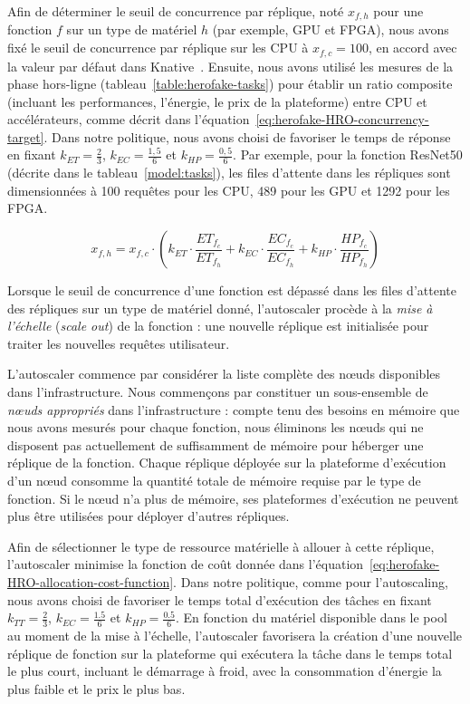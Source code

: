 Afin de déterminer le seuil de concurrence par réplique, noté $x_{f, h}$ pour une fonction $f$ sur un type de matériel $h$ (par exemple, GPU et FPGA), nous avons fixé le seuil de concurrence par réplique sur les CPU à $x_{f, c} = 100$, en accord avec la valeur par défaut dans Knative~\cite{knative-concurrency}. Ensuite, nous avons utilisé les mesures de la phase hors-ligne (tableau~\ref{table:herofake-tasks}) pour établir un ratio composite (incluant les performances, l'énergie, le prix de la plateforme) entre CPU et accélérateurs, comme décrit dans l'équation~\ref{eq:herofake-HRO-concurrency-target}. Dans notre politique, nous avons choisi de favoriser le temps de réponse en fixant $k_{ET} = \frac{2}{3}$, $k_{EC} = \frac{1,5}{6}$ et $k_{HP} = \frac{0,5}{6}$. Par exemple, pour la fonction ResNet50 (décrite dans le tableau~\ref{model:tasks}), les files d'attente dans les répliques sont dimensionnées à 100 requêtes pour les CPU, 489 pour les GPU et 1292 pour les FPGA.

\begin{equation}
    x_{f, h} = x_{f, c} \cdot (k_{ET} \cdot \frac{ET_{{f}_{c}}}{ET_{{f}_{h}}} + k_{EC} \cdot \frac{EC_{{f}_{c}}}{EC_{{f}_{h}}} + k_{HP} \cdot \frac{HP_{{f}_{c}}}{HP_{{f}_{h}}})
\label{eq:herofake-HRO-concurrency-target}
\end{equation}

Lorsque le seuil de concurrence d'une fonction est dépassé dans les files d'attente des répliques sur un type de matériel donné, l'autoscaler procède à la \textit{mise à l'échelle} (\textit{scale out}) de la fonction : une nouvelle réplique est initialisée pour traiter les nouvelles requêtes utilisateur.

L'autoscaler commence par considérer la liste complète des nœuds disponibles dans l'infrastructure. Nous commençons par constituer un sous-ensemble de \textit{nœuds appropriés} dans l'infrastructure : compte tenu des besoins en mémoire que nous avons mesurés pour chaque fonction, nous éliminons les nœuds qui ne disposent pas actuellement de suffisamment de mémoire pour héberger une réplique de la fonction. Chaque réplique déployée sur la plateforme d'exécution d'un nœud consomme la quantité totale de mémoire requise par le type de fonction. Si le nœud n'a plus de mémoire, ses plateformes d'exécution ne peuvent plus être utilisées pour déployer d'autres répliques.

Afin de sélectionner le type de ressource matérielle à allouer à cette réplique, l'autoscaler minimise la fonction de coût donnée dans l'équation~\ref{eq:herofake-HRO-allocation-cost-function}. Dans notre politique, comme pour l'autoscaling, nous avons choisi de favoriser le temps total d'exécution des tâches en fixant $k_{TT} = \frac{2}{3}$, $k_{EC} = \frac{1.5}{6}$ et $k_{HP} = \frac{0.5}{6}$. 
En fonction du matériel disponible dans le pool au moment de la mise à l'échelle, l'autoscaler favorisera la création d'une nouvelle réplique de fonction sur la plateforme qui exécutera la tâche dans le temps total le plus court, incluant le démarrage à froid, avec la consommation d'énergie la plus faible et le prix le plus bas.

